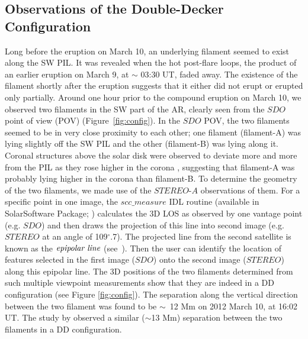 \documentclass{aastex62}
\begin{document}
\subsection{\textbf{Observations of the Double-Decker Configuration}}
\label{coronal_configuration}
Long before the eruption on March 10, an underlying filament seemed to exist along the SW PIL. It was revealed when the hot post-flare loops, the product of an earlier eruption on March 9, at $\sim$ 03:30 UT, faded away. The existence of the filament shortly after the eruption suggests that it either did not erupt or erupted only partially. Around one hour prior to the compound eruption on March 10, we observed two filaments in the SW part of the AR, clearly seen from the $\textit{SDO}$ point of view (POV) (Figure~\ref{fig:config}). In the $\textit{SDO}$ POV, the two filaments seemed to be in very close proximity to each other; one filament (filament-A) was lying slightly off the SW PIL and the other (filament-B) was lying along it. Coronal structures above the solar disk were observed to deviate more and more from the PIL as they rose higher in the corona \citep{Cheng_and_Ding_2016}, suggesting that filament-A was probably lying higher in the corona than filament-B. To determine the geometry of the two filaments, we made use of the $\textit{STEREO-A}$ observations of them. For a specific point in one image, the $scc{\_}measure$ IDL routine (available in SolarSoftware Package; \citealt{Freeland_and_Handy_1998}) calculates the 3D LOS as observed by one vantage point (e.g. $\textit{SDO}$) and then draws the projection of this line into second image (e.g. $\textit{STEREO}$ at an angle of 109$^{\circ}$.7). The projected line from the second satellite is known as the $\emph{epipolar line}$ (see~\citealt{Inhester_2006}). Then the user can identify the location of features selected in the first image ($\textit{SDO}$) onto the second image ($\textit{STEREO}$) along this epipolar line. The 3D positions of the two filaments determined from such multiple viewpoint measurements show that they are indeed in a DD configuration (see Figure \ref{fig:config}). The separation along the vertical direction between the two filament was found to be $\sim$~12 Mm on 2012 March 10, at 16:02 UT. The study by \citet{Liu_etal_2012} observed a similar ($\sim$13 Mm) separation between the two filaments in a DD configuration.  
\end{document}
